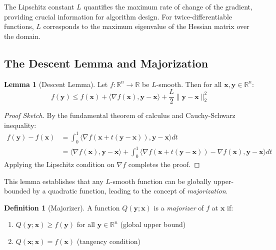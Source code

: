 \documentclass[12pt]{article}
\renewcommand{\vec}[1]{\mathbf{#1}}
\newcommand{\norm}[1]{\lVert #1 \rVert}
\newcommand{\R}{\mathbb{R}}
\theoremstyle{definition}
\newtheorem{definition}{Definition}[section]
\newtheorem{lemma}[theorem]{Lemma}
\begin{document}
The Lipschitz constant $L$ quantifies the maximum rate of change of the gradient, providing crucial information for algorithm design. For twice-differentiable functions, $L$ corresponds to the maximum eigenvalue of the Hessian matrix over the domain.

\subsection{The Descent Lemma and Majorization}

\begin{lemma}[Descent Lemma]\label{lem:descent}
    Let $f: \R^n \to \R$ be $L$-smooth. Then for all $\vec{x}, \vec{y} \in \R^n$:
    \begin{equation}
        f(\vec{y}) \leq f(\vec{x}) + \langle \nabla f(\vec{x}), \vec{y} - \vec{x} \rangle + \frac{L}{2}\norm{\vec{y} - \vec{x}}_2^2
    \end{equation}
\end{lemma}

\begin{proof}[Proof Sketch]
    By the fundamental theorem of calculus and Cauchy-Schwarz inequality:
    \begin{align}
        f(\vec{y}) - f(\vec{x}) & = \int_0^1 \langle \nabla f(\vec{x} + t(\vec{y} - \vec{x})), \vec{y} - \vec{x} \rangle dt                                                                            \\
                                & = \langle \nabla f(\vec{x}), \vec{y} - \vec{x} \rangle + \int_0^1 \langle \nabla f(\vec{x} + t(\vec{y} - \vec{x})) - \nabla f(\vec{x}), \vec{y} - \vec{x} \rangle dt
    \end{align}
    Applying the Lipschitz condition on $\nabla f$ completes the proof.
\end{proof}

This lemma establishes that any $L$-smooth function can be globally upper-bounded by a quadratic function, leading to the concept of \textit{majorization}.

\begin{definition}[Majorizer]
    A function $Q(\vec{y}; \vec{x})$ is a \textit{majorizer} of $f$ at $\vec{x}$ if:
    \begin{enumerate}
        \item $Q(\vec{y}; \vec{x}) \geq f(\vec{y})$ for all $\vec{y} \in \R^n$ (global upper bound)
        \item $Q(\vec{x}; \vec{x}) = f(\vec{x})$ (tangency condition)
    \end{enumerate}
\end{definition}
\end{document}

